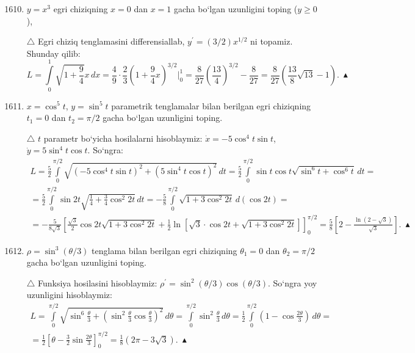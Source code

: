 \begin{enumerate}\setcounter{enumi}{1609}
	\item $y=x^3$ egri chiziqning $x=0$ dan $x=1$ gacha bo`lgan uzunligini toping ($y\ge0$), 
	
	$\triangle$ Egri chiziq tenglamasini differensiallab, $y^\prime=(3/2)x^{1/2}$ ni topamiz. Shunday qilib:
	$$L=\int\limits_{0}^{1}\sqrt{1+\frac{9}{4}}x\,dx=
	\frac{4}{9}\cdot\frac{2}{3}\left(1+\frac{9}{4}x\right)^{3/2}\bigg|_{0}^{1}=\frac{8}{27}\left(\frac{13}{4}\right)^{3/2}-\frac{8}{27}=\frac{8}{27}\left(\frac{13}{8}\sqrt{13}-1\right).\ \blacktriangle$$
	
	\item $x=\cos^5 t$, $y=\sin^5 t$ parametrik tenglamalar bilan berilgan egri chiziqning $t_1=0$ dan $t_2=\pi/2$ gacha bo`lgan uzunligini toping.
	
	$\triangle$ $t$ parametr bo`yicha hosilalarni hisoblaymiz: $\dot{x}=-5\cos^4 t\sin t$, $\dot{y}=5\sin^4 t\cos t$. So`ngra:
\begin{multline*}L=\frac{5}{2}\int\limits_{0}^{\pi/2}\sqrt{(-5\cos^4 t\sin t)^2+(5\sin^4 t\cos t)^2}\,dt=\frac{5}{2}\int\limits_{0}^{\pi/2}\sin t\cos t\sqrt{\sin^6 t+\cos^6 t}\,dt=\\
	=\frac{5}{2}\int\limits_0^{\pi/2}\sin 2t\sqrt{\frac{1}{4}+\frac{3}{4}\cos^2 2t}\,dt=-\frac{5}{8}\int\limits_0^{\pi/2}\sqrt{1+3\cos^2 2t}\,d(\cos 2t)=\\
	=-\frac{5}{8\sqrt{3}}\left[\frac{\sqrt{3}}{2}\cos 2t\sqrt{1+3\cos^2 2t}+\frac{1}{2}\ln\left[\sqrt{3}\cdot\cos 2t+\sqrt{1+3\cos^2 2t}\right]\right]_{0}^{\pi/2}=\frac{5}{8}\left[2-\frac{\ln(2-\sqrt{3})}{\sqrt{3}}\right].\ \blacktriangle
\end{multline*}

\item $\rho=\sin^3(\theta/3)$ tenglama bilan berilgan egri chiziqning $\theta_1=0$ dan $\theta_2=\pi/2$ gacha bo`lgan uzunligini toping.

$\triangle$ Funksiya hosilasini hisoblaymiz: $\rho^\prime=\sin^2(\theta/3)\cos(\theta/3)$. So`ngra yoy uzunligini hisoblaymiz:
\begin{multline*}
	L=\int\limits_{0}^{\pi/2}\sqrt{\sin^6 \frac{\theta}{3}+\left(\sin^2 \frac{\theta}{3}\cos\frac{\theta}{3}\right)^{2}}\,d\theta=\int\limits_{0}^{\pi/2}\sin^2 \frac{\theta}{3}\,d\theta=\frac{1}{2}\int\limits_{0}^{\pi/2}\left(1-\cos\frac{2\theta}{3}\right)\,d\theta=\\
	=\frac{1}{2}\left[\theta-\frac{3}{2}\sin\frac{2\theta}{3}\right]_{0}^{\pi/2}=\frac{1}{8}\left(2\pi-3\sqrt{3}\right).\ \blacktriangle
\end{multline*}
\end{enumerate}

